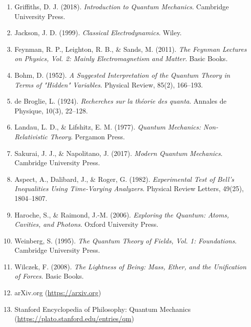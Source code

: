 \documentclass[12pt,a4paper]{article}
\begin{document}
\begin{enumerate}
    \item Griffiths, D. J. (2018). \textit{Introduction to Quantum Mechanics}. Cambridge University Press.
    
    \item Jackson, J. D. (1999). \textit{Classical Electrodynamics}. Wiley.
    
    \item Feynman, R. P., Leighton, R. B., \& Sands, M. (2011). \textit{The Feynman Lectures on Physics, Vol. 2: Mainly Electromagnetism and Matter}. Basic Books.
    
    \item Bohm, D. (1952). \textit{A Suggested Interpretation of the Quantum Theory in Terms of "Hidden" Variables}. Physical Review, 85(2), 166--193.
    
    \item de Broglie, L. (1924). \textit{Recherches sur la théorie des quanta}. Annales de Physique, 10(3), 22--128.
    
    \item Landau, L. D., \& Lifshitz, E. M. (1977). \textit{Quantum Mechanics: Non-Relativistic Theory}. Pergamon Press.
    
    \item Sakurai, J. J., \& Napolitano, J. (2017). \textit{Modern Quantum Mechanics}. Cambridge University Press.
    
    \item Aspect, A., Dalibard, J., \& Roger, G. (1982). \textit{Experimental Test of Bell's Inequalities Using Time-Varying Analyzers}. Physical Review Letters, 49(25), 1804--1807.
    
    \item Haroche, S., \& Raimond, J.-M. (2006). \textit{Exploring the Quantum: Atoms, Cavities, and Photons}. Oxford University Press.
    
    \item Weinberg, S. (1995). \textit{The Quantum Theory of Fields, Vol. 1: Foundations}. Cambridge University Press.
    
    \item Wilczek, F. (2008). \textit{The Lightness of Being: Mass, Ether, and the Unification of Forces}. Basic Books.
    
    \item arXiv.org (\url{https://arxiv.org})
    
    \item Stanford Encyclopedia of Philosophy: Quantum Mechanics (\url{https://plato.stanford.edu/entries/qm})
\end{enumerate}
\end{document}
